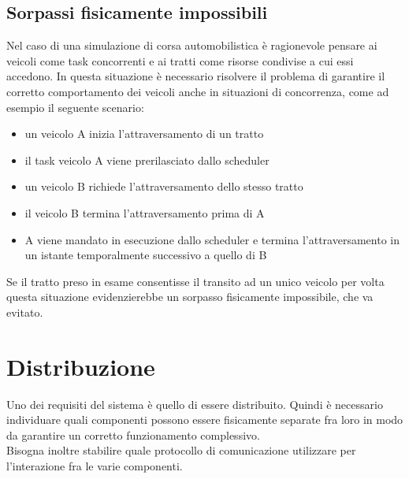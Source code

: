  \subsection{Sorpassi fisicamente impossibili}
 Nel caso di una simulazione di corsa automobilistica è ragionevole pensare ai veicoli come task concorrenti e ai tratti come risorse condivise a cui essi accedono. In questa situazione è necessario risolvere il problema di garantire il corretto comportamento dei veicoli anche in situazioni di concorrenza, come ad esempio il seguente scenario:
 \begin{itemize}
 \item un veicolo A inizia l'attraversamento di un tratto
 \item il task veicolo A viene prerilasciato dallo scheduler
 \item un veicolo B richiede l'attraversamento dello stesso tratto
 \item il veicolo B termina l'attraversamento prima di A
 \item A viene mandato in esecuzione dallo scheduler e termina l'attraversamento in un istante temporalmente successivo a quello di B
 \end{itemize}
 Se il tratto preso in esame consentisse il transito ad un unico veicolo per volta questa situazione evidenzierebbe un sorpasso fisicamente impossibile, che va evitato.

\section{Distribuzione}
Uno dei requisiti del sistema è quello di essere distribuito. Quindi è necessario individuare quali componenti possono essere fisicamente separate fra loro in modo da garantire un corretto funzionamento complessivo.
\\
Bisogna inoltre stabilire quale protocollo di comunicazione utilizzare per l'interazione fra le varie componenti.